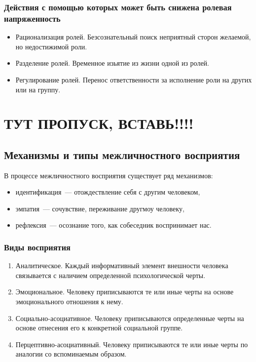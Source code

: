\subsubsection{Действия с помощью которых может быть снижена ролевая напряженность}
\begin{itemize}
	\item Рационализация ролей. Безсознательный поиск неприятный сторон желаемой, но недостижимой роли.
	\item Разделение ролей. Временное изьятие из жизни одной из ролей.
	\item Регулирование ролей. Перенос ответственности за исполнение роли на других или на группу.
\end{itemize}

\section{ТУТ ПРОПУСК, ВСТАВЬ!!!!}

\subsection{Механизмы и типы межличностного восприятия}
В процессе межличностного восприятия существует ряд механизмов:
\begin{itemize}
	\item идентификация~--- отождествление себя с другим человеком,
	\item эмпатия~--- сочувствие, переживание другмоу человеку,
	\item рефлексия~--- осознание того, как собеседник воспринимает нас.
\end{itemize}

\subsubsection{Виды восприятия}
\begin{enumerate}
	\item Аналитическое. Каждый информативный элемент внешности человека связывается с наличием определенной психологической черты.
	\item Эмоциональное. Человеку приписываются те или иные черты на основе эмоционального отношения к нему.
	\item Социально-асоциативное. Человеку приписываются определенные черты на основе отнесения его к конкретной социальной группе.
	\item Перцептивно-асоциативный. Человеку приписываются те или иные черты по аналогии со вспоминаемым образом.
\end{enumerate}

